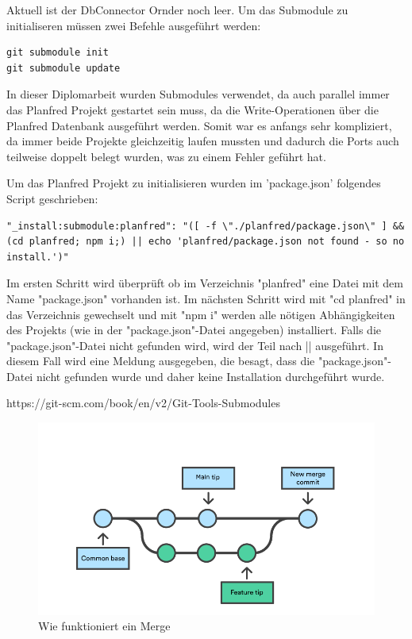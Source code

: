 Aktuell ist der DbConnector Ornder noch leer. Um das Submodule zu initialiseren müssen zwei Befehle ausgeführt werden:

\begin{lstlisting}
git submodule init
git submodule update
\end{lstlisting}

In dieser Diplomarbeit wurden Submodules verwendet, da auch parallel immer das Planfred Projekt gestartet sein muss, da die Write-Operationen über die Planfred Datenbank ausgeführt werden. Somit war es anfangs sehr kompliziert, da immer beide Projekte gleichzeitig laufen mussten und dadurch die Ports auch teilweise doppelt belegt wurden, was zu einem Fehler geführt hat.

Um das Planfred Projekt zu initialisieren wurden im 'package.json' folgendes Script geschrieben:

\begin{lstlisting}
"_install:submodule:planfred": "([ -f \"./planfred/package.json\" ] && (cd planfred; npm i;) || echo 'planfred/package.json not found - so no install.')"
\end{lstlisting}

Im ersten Schritt wird überprüft ob im Verzeichnis "planfred" eine Datei mit dem Name "package.json" vorhanden ist. Im nächsten Schritt wird mit "cd planfred" in das Verzeichnis gewechselt und mit "npm i" werden alle nötigen Abhängigkeiten des Projekts (wie in der "package.json"-Datei angegeben) installiert. Falls die "package.json"-Datei nicht gefunden wird, wird der Teil nach || ausgeführt. In diesem Fall wird eine Meldung ausgegeben, die besagt, dass die "package.json"-Datei nicht gefunden wurde und daher keine Installation durchgeführt wurde.




https://git-scm.com/book/en/v2/Git-Tools-Submodules

\begin{figure}[h!]
    \centering
    \includegraphics[width=0.6\linewidth]{pics/merge.png}
    \caption{Wie funktioniert ein Merge}
    \label{fig:enter-label}
\end{figure}

